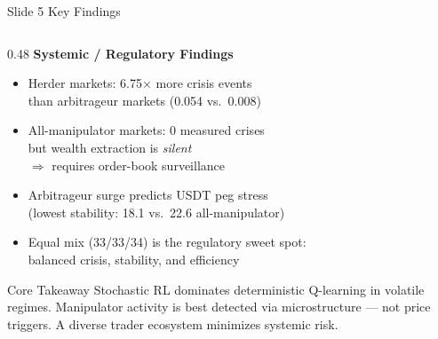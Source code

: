 \documentclass[aspectratio=169, 10pt]{beamer}
\newcommand{\blu}[1]{{\color{accentblue}#1}}
\newcommand{\grn}[1]{{\color{accentgreen}#1}}
\begin{document}
\begin{frame}[t]{Slide 5 \quad Key Findings}
\begin{columns}[T]
  \begin{column}{0.48\textwidth}
    \textbf{\small\textcolor{cornellred}{Systemic / Regulatory Findings}}
    \begin{itemize}\setlength\itemsep{2pt}\small
      \item Herder markets: \blu{6.75$\times$} more crisis events\\
            than arbitrageur markets (0.054 vs.\ 0.008)
      \item All-manipulator markets: \blu{0} measured crises\\
            but wealth extraction is \textit{silent}\\
            $\Rightarrow$ requires order-book surveillance
      \item Arbitrageur surge predicts USDT peg stress\\
            (lowest stability: 18.1 vs.\ 22.6 all-manipulator)
      \item \grn{Equal mix (33/33/34)} is the regulatory sweet spot:\\
            balanced crisis, stability, and efficiency
    \end{itemize}

    \vspace{4pt}
    \begin{alertblock}{\small Core Takeaway}
    \small
    Stochastic RL dominates deterministic Q-learning
    in volatile regimes. Manipulator activity is best
    detected via microstructure --- not price triggers.
    A diverse trader ecosystem minimizes systemic risk.
    \end{alertblock}
  \end{column}

\end{columns}
\end{frame}
\end{document}

